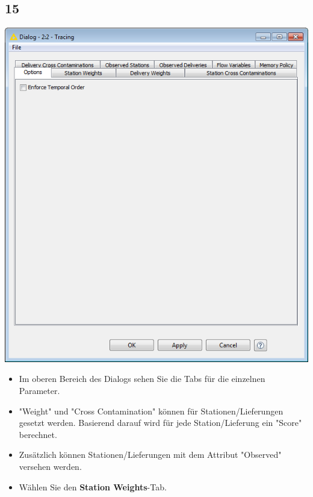 \documentclass{beamer}
\begin{document}
\subsection{15}
\begin{frame}
	\begin{center}
  		\includegraphics[height=0.5\textheight]{15.png}
	\end{center}
	\begin{itemize}
		\item Im oberen Bereich des Dialogs sehen Sie die Tabs für die einzelnen Parameter.
		\item "Weight" und "Cross Contamination" können für Stationen/Lieferungen gesetzt werden. Basierend darauf wird für jede Station/Lieferung ein "Score" berechnet.
		\item Zusätzlich können Stationen/Lieferungen mit dem Attribut "Observed" versehen werden.
		\item Wählen Sie den \textbf{Station Weights}-Tab.
	\end{itemize}
\end{frame}
\end{document}
